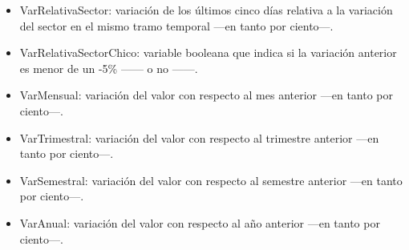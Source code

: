 \documentclass[a4paper, 11pt, titlepage]{article}
\theoremstyle{definition}
\begin{document}
\begin{enumerate}
\begin{itemize}
            \item VarRelativaSector: variación de los últimos cinco días relativa a la variación del sector en el mismo tramo temporal ---en tanto por ciento---.
            \item VarRelativaSectorChico: variable booleana que indica si la variación anterior es menor de un -5\% ------ o no ------.
            \item VarMensual: variación del valor con respecto al mes anterior ---en tanto por ciento---.
            \item VarTrimestral: variación del valor con respecto al trimestre anterior ---en tanto por ciento---.
            \item VarSemestral: variación del valor con respecto al semestre anterior ---en tanto por ciento---.
            \item VarAnual: variación del valor con respecto al año anterior ---en tanto por ciento---.
        \end{itemize}


\end{enumerate}
\end{document}
